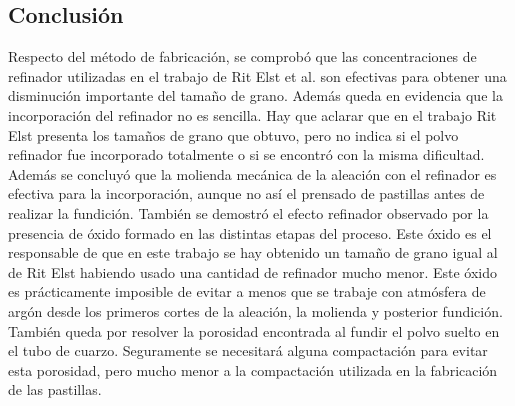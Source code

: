 \documentclass[a4paper,12pt,fleqn,twoside,openany]{book}
\begin{document}
% 
% 
% 
% 
% 

\subsection{Conclusión} \label{TamañosConclusion}

Respecto del método de fabricación, se comprobó que las concentraciones de refinador utilizadas en el trabajo de Rit Elst et al. \cite{ritelst} son efectivas para obtener una disminución importante del tamaño de grano. Además queda en evidencia que la incorporación del refinador no es sencilla. Hay que aclarar que en el trabajo Rit Elst presenta los tamaños de grano que obtuvo, pero no indica si el polvo refinador fue incorporado totalmente o si se encontró con la misma dificultad. Además se concluyó que la molienda mecánica de la aleación con el refinador es efectiva para la incorporación, aunque no así el prensado de pastillas antes de realizar la fundición. También se demostró el efecto refinador observado por la presencia de óxido formado en las distintas etapas del proceso. Este óxido es el responsable de que en este trabajo se hay obtenido un tamaño de grano igual al de Rit Elst habiendo usado una cantidad de refinador mucho menor. Este óxido es prácticamente imposible de evitar a menos que se trabaje con atmósfera de argón desde los primeros cortes de la aleación, la molienda y posterior fundición. También queda por resolver la porosidad encontrada al fundir el polvo suelto en el tubo de cuarzo. Seguramente se necesitará alguna compactación para evitar esta porosidad, pero mucho menor a la compactación utilizada en la fabricación de las pastillas.
\end{document}
